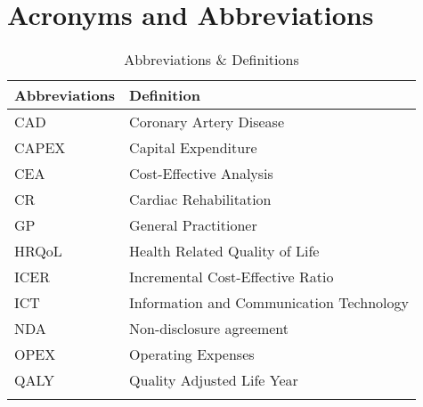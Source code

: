 \chapter{Acronyms and Abbreviations}


\begin{longtabu} to 
	\textbf{Abbreviations} & \textbf{Definition}\\[-1ex]
	\midrule
	CAD & Coronary Artery Disease \\[-1ex]
	CAPEX & Capital Expenditure \\[-1ex]
	CEA & Cost-Effective Analysis \\[-1ex]
	CR & Cardiac Rehabilitation \\[-1ex]
	GP & General Practitioner \\[-1ex]
	HRQoL & Health Related Quality of Life \\[-1ex]
	ICER & Incremental Cost-Effective Ratio \\[-1ex]
	ICT & Information and Communication Technology \\[-1ex]
	NDA & Non-disclosure agreement \\[-1ex]
	OPEX & Operating Expenses \\[-1ex]
	QALY & Quality Adjusted Life Year \\[-1ex]
	\caption{Abbreviations \& Definitions}
\end{longtabu}



